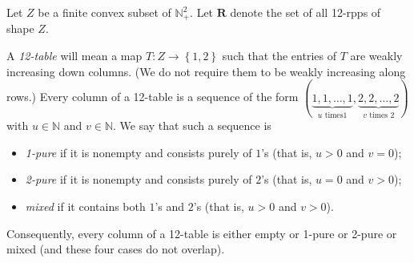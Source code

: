 \documentclass[numbers=enddot,12pt,final,onecolumn,notitlepage]{scrartcl}%
\theoremstyle{definition}
\begin{document}
Let $Z$ be a finite convex subset of $\mathbb{N}_{+}^{2}$. Let $\mathbf{R}$
denote the set of all 12-rpps of shape $Z$.

A \textit{12-table} will mean a map $T:Z\rightarrow\left\{  1,2\right\}  $
such that the entries of $T$ are weakly increasing down columns. (We do not
require them to be weakly increasing along rows.) Every column of a 12-table
is a sequence of the form $\left(  \underbrace{1,1,\ldots,1}_{u\text{ times
}1},\underbrace{2,2,\ldots,2}_{v\text{ times }2}\right)  $ with $u\in
\mathbb{N}$ and $v\in\mathbb{N}$. We say that such a sequence is

\begin{itemize}
\item \textit{1-pure} if it is nonempty and consists purely of $1$'s (that is,
$u>0$ and $v=0$);

\item \textit{2-pure} if it is nonempty and consists purely of $2$'s (that is,
$u=0$ and $v>0$);

\item \textit{mixed} if it contains both $1$'s and $2$'s (that is, $u>0$ and
$v>0$).
\end{itemize}

Consequently, every column of a 12-table is either empty or 1-pure or 2-pure
or mixed (and these four cases do not overlap).
\end{document}
